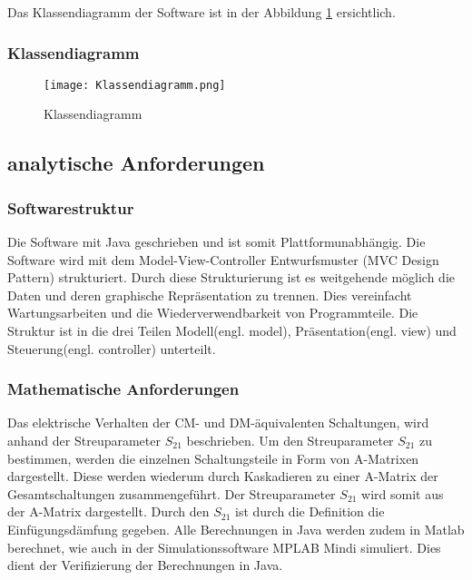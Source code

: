 Das Klassendiagramm der Software ist in der Abbildung \ref{fig:Klassendiagramm} ersichtlich.

\newpage

\subsubsection{Klassendiagramm} \label{subsubsec:Klassendiagramm}

\begin{figure}[H]
	\centering
	\texttt{[image: Klassendiagramm.png]}
	\caption{Klassendiagramm}
	\label{fig:Klassendiagramm}
\end{figure} 

\newpage

\subsection{analytische Anforderungen} \label{subsubsec:analytischeanforderungen}

\bigskip
{}
\subsubsection{Softwarestruktur} \label{subsubsec:Softwarestruktur}
Die Software mit Java geschrieben und ist somit Plattformunabhängig. Die Software wird mit dem Model-View-Controller Entwurfsmuster (MVC Design Pattern) \cite{MVCDesignPattern} strukturiert. Durch diese Strukturierung ist es weitgehende möglich die Daten und deren graphische Repräsentation zu trennen. Dies vereinfacht Wartungsarbeiten und die Wiederverwendbarkeit von Programmteile. Die Struktur ist in die drei Teilen Modell(engl. model), Präsentation(engl. view) und Steuerung(engl. controller) unterteilt.

\bigskip
\subsubsection{Mathematische Anforderungen}\label{subsubsec:mathematischeanforderungen}
Das elektrische Verhalten der CM- und DM-äquivalenten Schaltungen, wird anhand der Streuparameter $S_{21}$ beschrieben. Um den Streuparameter $S_{21}$ zu bestimmen, werden die einzelnen Schaltungsteile in Form von A-Matrixen dargestellt. Diese werden wiederum durch Kaskadieren zu einer A-Matrix der Gesamtschaltungen  zusammengeführt. Der Streuparameter $S_{21}$ wird somit aus der A-Matrix dargestellt. Durch den $S_{21}$ ist durch die Definition die Einfügungsdämfung gegeben. Alle Berechnungen in Java werden zudem in Matlab berechnet, wie auch in der Simulationssoftware MPLAB Mindi simuliert. Dies dient der Verifizierung der Berechnungen in Java.
\bigskip
